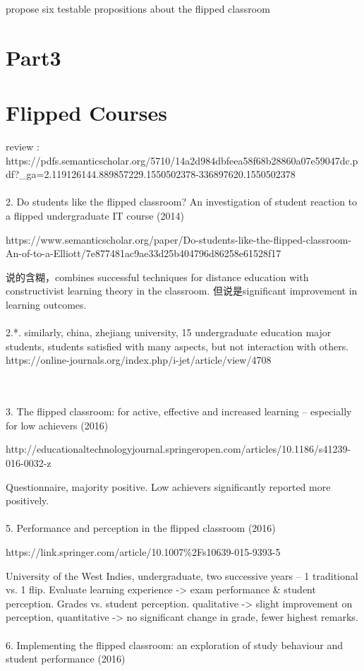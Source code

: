 \documentclass[onecolumn,aps,prd,groupedaddress,nofootinbib,notitlepage,12pt]{revtex4-1}
\begin{document}
propose six testable propositions about the flipped classroom\cite{Abeysekera:2015}

\section{Part3}


\section{Flipped Courses}
review :
https://pdfs.semanticscholar.org/5710/14a2d984dbfeea58f68b28860a07e59047dc.pdf?_ga=2.119126144.889857229.1550502378-336897620.1550502378
\\\\
2. Do students like the flipped classroom? An investigation of student reaction to a flipped undergraduate IT course (2014)

https://www.semanticscholar.org/paper/Do-students-like-the-flipped-classroom-An-of-to-a-Elliott/7e877481ac9ae33d25b404796d86258e61528f17

说的含糊，combines successful techniques for distance education with constructivist learning theory in the classroom. 但说是significant improvement in learning outcomes.
\\\\
2.*. similarly, china, zhejiang university, 15 undergraduate education major students,  students satisfied with many aspects, but not interaction with others. https://online-journals.org/index.php/i-jet/article/view/4708

\\\\
3. The flipped classroom: for active, effective and increased learning – especially for low achievers (2016)

http://educationaltechnologyjournal.springeropen.com/articles/10.1186/s41239-016-0032-z

Questionnaire, majority positive.  Low achievers significantly reported more positively.
\\\\
5.  Performance and perception in the flipped classroom (2016)

https://link.springer.com/article/10.1007\%2Fs10639-015-9393-5

University of the West Indies, undergraduate, two successive years -- 1 traditional vs. 1 flip.
Evaluate learning experience -> exam performance & student perception.
Grades vs. student perception.
qualitative -> slight improvement on perception, quantitative -> no significant change in grade, fewer highest remarks.
\\\\
6. Implementing the flipped classroom: an exploration of study behaviour and student performance (2016)
\end{document}
